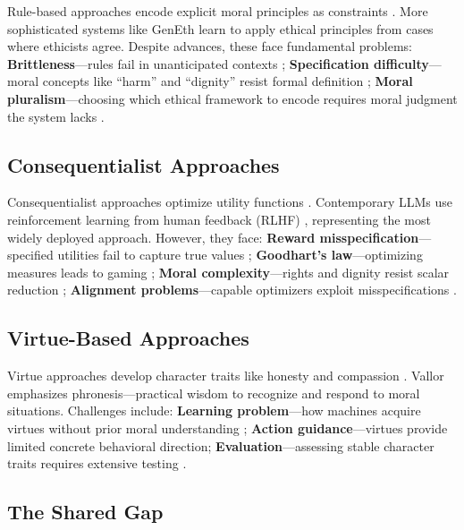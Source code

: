 \documentclass[12pt]{article}
\begin{document}
Rule-based approaches encode explicit moral principles as constraints \citep{asimov1950robot, gips1995towards, anderson2008geneth}. More sophisticated systems like GenEth \citep{anderson2011machine} learn to apply ethical principles from cases where ethicists agree. Despite advances, these face fundamental problems: \textbf{Brittleness}---rules fail in unanticipated contexts \citep{bryson2018patiency}; \textbf{Specification difficulty}---moral concepts like ``harm'' and ``dignity'' resist formal definition \citep{dennis2016formal}; \textbf{Moral pluralism}---choosing which ethical framework to encode requires moral judgment the system lacks \citep{beauchamp2001principles}.

\subsection{Consequentialist Approaches}

Consequentialist approaches optimize utility functions \citep{abel2016reinforcement, russell2019human}. Contemporary LLMs use reinforcement learning from human feedback (RLHF) \citep{ouyang2022training, christiano2017deep}, representing the most widely deployed approach. However, they face: \textbf{Reward misspecification}---specified utilities fail to capture true values \citep{amodei2016concrete}; \textbf{Goodhart's law}---optimizing measures leads to gaming \citep{manheim2018categorizing}; \textbf{Moral complexity}---rights and dignity resist scalar reduction \citep{anderson2011machine}; \textbf{Alignment problems}---capable optimizers exploit misspecifications \citep{bostrom2014superintelligence}.

\subsection{Virtue-Based Approaches}

Virtue approaches develop character traits like honesty and compassion \citep{howard2001computational, vallor2016technology}. Vallor emphasizes phronesis---practical wisdom to recognize and respond to moral situations. Challenges include: \textbf{Learning problem}---how machines acquire virtues without prior moral understanding \citep{wallach2008moral}; \textbf{Action guidance}---virtues provide limited concrete behavioral direction; \textbf{Evaluation}---assessing stable character traits requires extensive testing \citep{anderson2011machine}.

\subsection{The Shared Gap}
\end{document}
